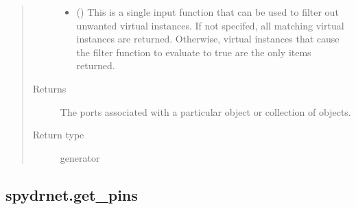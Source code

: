 \documentclass[letterpaper,10pt,english,openany,oneside]{sphinxmanual}
\begin{document}
\begin{fulllineitems}
\begin{quote}
\begin{description}
\begin{itemize}
\item {} 
 () \textendash{} This is a single input function that can be used to filter out unwanted virtual instances. If not specifed, all
matching virtual instances are returned. Otherwise, virtual instances that cause the filter function to evaluate
to true are the only items returned.

\end{itemize}

\item[{Returns}] \leavevmode
{} \textendash{} The ports associated with a particular object or collection of objects.

\item[{Return type}] \leavevmode
generator

\end{description}\end{quote}

\end{fulllineitems}



\subsection{spydrnet.get\_pins}
\label{\detokenize{reference/classes/generated/spydrnet.get_pins:spydrnet-get-pins}}\label{\detokenize{reference/classes/generated/spydrnet.get_pins::doc}}
\end{document}
